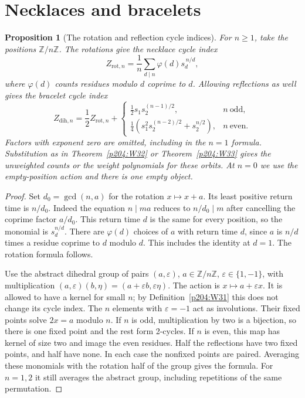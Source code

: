 \documentclass[11pt,oneside,openany]{book}
\theoremstyle{plain}
\newtheorem{proposition}[theorem]{Proposition}
\theoremstyle{definition}
\theoremstyle{remark}
\begin{document}
\section{Necklaces and bracelets}

\begin{proposition}[The rotation and reflection cycle indices]
\label{p204:W34}
For \(n\ge1\), take the positions \(\mathbb Z/n\mathbb Z\).
The rotations give the necklace cycle index
\[
 Z_{\mathrm{rot},n}
 =\frac1n\sum_{d\mid n}\varphi(d)s_d^{\,n/d},
\]
where \(\varphi(d)\) counts residues modulo \(d\) coprime to \(d\).
Allowing reflections as well gives the bracelet cycle index
\[
 Z_{\mathrm{dih},n}
 =\frac12 Z_{\mathrm{rot},n}
  +\begin{cases}
     \frac12s_1s_2^{(n-1)/2},& n\ \text{odd},\\[2pt]
     \frac14\left(s_1^2s_2^{(n-2)/2}+s_2^{n/2}\right),
       & n\ \text{even}.
   \end{cases}
\]
Factors with exponent zero are omitted, including in the \(n=1\)
formula. Substitution as in Theorem~\ref{p204:W32} or
Theorem~\ref{p204:W33} gives the unweighted counts or the weight
polynomials for these orbits. At \(n=0\) we use the empty-position
action and there is one empty object.
\end{proposition}
\begin{proof}
Set \(d_0=\gcd(n,a)\) for the rotation \(x\mapsto x+a\).
Its least positive return time is \(n/d_0\). Indeed the equation
\(n\mid ma\) reduces to \(n/d_0\mid m\) after cancelling the
coprime factor \(a/d_0\). This return time \(d\) is the same
for every position, so the monomial is \(s_d^{n/d}\).
There are \(\varphi(d)\) choices of \(a\) with return time \(d\),
since \(a\) is \(n/d\) times a residue coprime to \(d\) modulo \(d\).
This includes the identity at \(d=1\). The rotation formula follows.

Use the abstract dihedral group of pairs
\((a,\varepsilon)\), \(a\in\mathbb Z/n\mathbb Z\),
\(\varepsilon\in\{1,-1\}\), with multiplication
\((a,\varepsilon)(b,\eta)=(a+\varepsilon b,\varepsilon\eta)\).
The action is \(x\mapsto a+\varepsilon x\). It is allowed to have
a kernel for small \(n\); by Definition~\ref{p204:W31} this does
not change its cycle index. The \(n\) elements with
\(\varepsilon=-1\) act as involutions. Their fixed points solve
\(2x=a\) modulo \(n\). If \(n\) is odd, multiplication by two
is a bijection, so there is one fixed point and the rest form
2-cycles. If \(n\) is even, this map has kernel of size two and
image the even residues. Half the reflections have two fixed
points, and half have none. In each case the nonfixed points
are paired. Averaging these monomials with the rotation half of
the group gives the formula. For \(n=1,2\) it still averages
the abstract group, including repetitions of the same permutation.
\end{proof}
\end{document}
